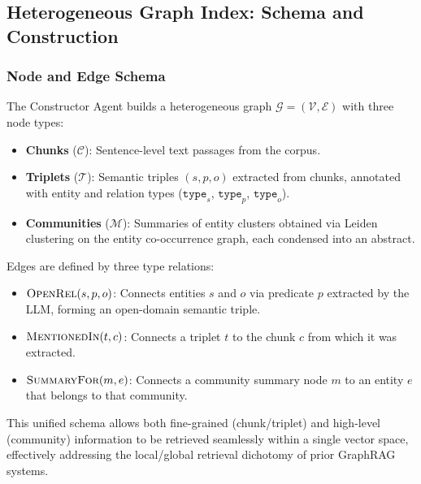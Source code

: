
\subsection{Heterogeneous Graph Index: Schema and Construction}
\label{subsec:index-graph}

\subsubsection{Node and Edge Schema}
The Constructor Agent builds a heterogeneous graph $\mathcal{G}=(\mathcal{V},\mathcal{E})$ with three node types:
\begin{itemize}
    \item \textbf{Chunks} ($\mathcal{C}$): Sentence-level text passages from the corpus. 
    \item \textbf{Triplets} ($\mathcal{T}$): Semantic triples $(s, p, o)$ extracted from chunks, annotated with entity and relation types ($\texttt{type}_s$, $\texttt{type}_p$, $\texttt{type}_o$).
    \item \textbf{Communities} ($\mathcal{M}$): Summaries of entity clusters obtained via Leiden clustering on the entity co-occurrence graph, each condensed into an abstract.
\end{itemize}
Edges are defined by three type relations:
\begin{itemize}
    \item \textbf{$\textsc{OpenRel}(s, p, o)$}: Connects entities $s$ and $o$ via predicate $p$ extracted by the LLM, forming an open-domain semantic triple.
    \item \textbf{$\textsc{MentionedIn}(t, c)$}: Connects a triplet $t$ to the chunk $c$ from which it was extracted.
    \item \textbf{$\textsc{SummaryFor}(m, e)$}: Connects a community summary node $m$ to an entity $e$ that belongs to that community.
\end{itemize}
This unified schema allows both fine-grained (chunk/triplet) and high-level (community) information to be retrieved seamlessly within a single vector space, effectively addressing the local/global retrieval dichotomy of prior GraphRAG systems.

